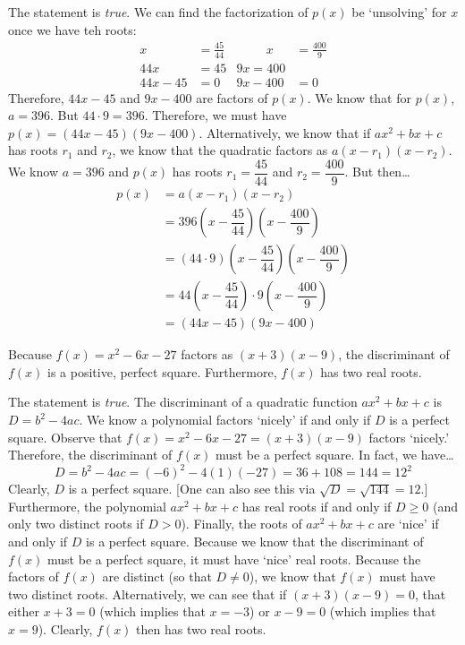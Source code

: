 \documentclass[11pt,letterpaper]{article}
\begin{document}
\sol The statement is \textit{true}. We can find the factorization of $p(x)$ be `unsolving' for $x$ once we have teh roots:
	\[
	\begin{aligned}
	x&= \frac{45}{44} &\hspace{1cm} x&= \frac{400}{9} \\[0.2cm]
	44x&= 45 & 9x= 400 \\[0.2cm]
	44x - 45&= 0 & 9x - 400&= 0
	\end{aligned}
	\]
Therefore, $44x - 45$ and $9x - 400$ are factors of $p(x)$. We know that for $p(x)$, $a= 396$. But $44 \cdot 9= 396$. Therefore, we must have $p(x)= (44x - 45)(9x - 400)$. Alternatively, we know that if $ax^2 + bx + c$ has roots $r_1$ and $r_2$, we know that the quadratic factors as $a(x - r_1)(x - r_2)$. We know $a= 396$ and $p(x)$ has roots $r_1= \dfrac{45}{44}$ and $r_2= \dfrac{400}{9}$. But then\dots
	\[
	\begin{aligned}
	p(x)&= a(x - r_1)(x - r_2) \\
	&= 396 \left(x - \dfrac{45}{44} \right) \left(x - \dfrac{400}{9} \right) \\
	&= (44 \cdot 9) \left(x - \dfrac{45}{44} \right) \left(x - \dfrac{400}{9} \right) \\
	&= 44 \left(x - \dfrac{45}{44} \right) \cdot 9 \left(x - \dfrac{400}{9} \right) \\
	&= (44x - 45)(9x - 400)
	\end{aligned}
	\] \pvspace{1.3cm}



 Because $f(x)= x^2 - 6x - 27$ factors as $(x + 3)(x - 9)$, the discriminant of $f(x)$ is a positive, perfect square. Furthermore, $f(x)$ has two real roots. \pspace

\sol The statement is \textit{true}. The discriminant of a quadratic function $ax^2 + bx + c$ is $D= b^2 - 4ac$. We know a polynomial factors `nicely' if and only if $D$ is a perfect square. Observe that $f(x)= x^2 - 6x - 27= (x + 3)(x- 9)$ factors `nicely.' Therefore, the discriminant of $f(x)$ must be a perfect square. In fact, we have\dots
	\[
	D= b^2 - 4ac= (-6)^2 - 4(1)(-27)= 36 + 108= 144= 12^2
	\]
Clearly, $D$ is a perfect square. [One can also see this via $\sqrt{D}= \sqrt{144}= 12$.] Furthermore, the polynomial $ax^2 + bx + c$ has real roots if and only if $D \geq 0$ (and only two distinct roots if $D > 0$). Finally, the roots of $ax^2 + bx + c$ are `nice' if and only if $D$ is a perfect square. Because we know that the discriminant of $f(x)$ must be a perfect square, it must have `nice' real roots. Because the factors of $f(x)$ are distinct (so that $D \neq 0$), we know that $f(x)$ must have two distinct roots. Alternatively, we can see that if $(x + 3)(x - 9)= 0$, that either $x + 3= 0$ (which implies that $x= -3$) or $x - 9= 0$ (which implies that $x= 9$). Clearly, $f(x)$ then has two real roots. \pvspace{1.3cm}
\end{document}
